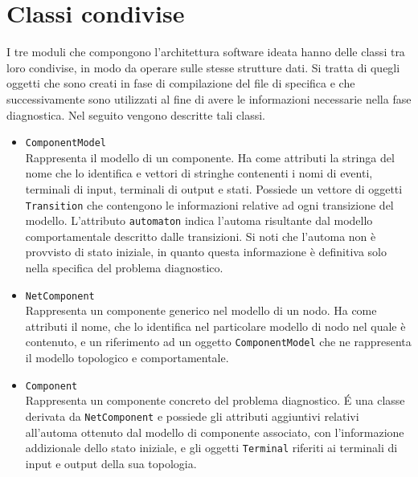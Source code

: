 \section{Classi condivise}
I tre moduli che compongono l'architettura software ideata hanno delle classi tra loro condivise, in modo da operare sulle stesse strutture dati. Si tratta di quegli oggetti che sono creati in fase di compilazione del file di specifica e che successivamente sono utilizzati al fine di avere le informazioni necessarie nella fase diagnostica.
Nel seguito vengono descritte tali classi.
\begin{itemize}

\item \verb|ComponentModel|\\ 
Rappresenta il modello di un componente. Ha come attributi la stringa del nome che lo identifica e vettori di stringhe contenenti i nomi di eventi, terminali di input, terminali di output e stati. Possiede un vettore di oggetti \verb|Transition| che contengono le informazioni relative ad ogni transizione del modello. L'attributo \verb|automaton| indica l'automa risultante dal modello comportamentale descritto dalle transizioni. Si noti che l'automa non è provvisto di stato iniziale, in quanto questa informazione è definitiva solo nella specifica del problema diagnostico.

\item \verb|NetComponent|\\
Rappresenta un componente generico nel modello di un nodo. Ha come attributi il nome, che lo identifica nel particolare modello di nodo nel quale è contenuto, e un riferimento ad un oggetto \verb|ComponentModel| che ne rappresenta il modello topologico e comportamentale.

\item \verb|Component|\\
Rappresenta un componente concreto del problema diagnostico. \'E una classe derivata da \verb|NetComponent| e possiede gli attributi aggiuntivi relativi all'automa ottenuto dal modello di componente associato, con l'informazione addizionale dello stato iniziale, e gli oggetti \verb|Terminal| riferiti ai terminali di input e output della sua topologia.


\end{itemize}
